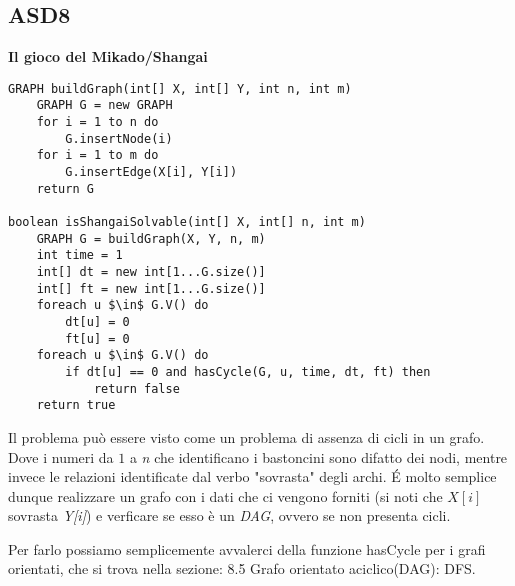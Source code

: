 \documentclass[../cheatSheetAlgoritmi.tex]{subfiles}
\begin{document}
\subsection{ASD8}
\textbf{Il gioco del Mikado/Shangai}
\begin{lstlisting}[caption=Posso vincere Mikado/Shangai in un unico turno?]
GRAPH buildGraph(int[] X, int[] Y, int n, int m)
	GRAPH G = new GRAPH
  	for i = 1 to n do
    	G.insertNode(i)
  	for i = 1 to m do
    	G.insertEdge(X[i], Y[i])
  	return G

boolean isShangaiSolvable(int[] X, int[] n, int m)
	GRAPH G = buildGraph(X, Y, n, m)
  	int time = 1
  	int[] dt = new int[1...G.size()]
  	int[] ft = new int[1...G.size()]
  	foreach u $\in$ G.V() do
    	dt[u] = 0
    	ft[u] = 0
  	foreach u $\in$ G.V() do
    	if dt[u] == 0 and hasCycle(G, u, time, dt, ft) then
      		return false
  	return true
\end{lstlisting}
Il problema può essere visto come un problema di assenza di cicli in un grafo. Dove i numeri da $1$ a \textit{n} che identificano i bastoncini sono difatto dei nodi, mentre invece le relazioni identificate dal verbo "sovrasta" degli archi. É molto semplice dunque realizzare un grafo con i dati che ci vengono forniti (si noti che $X[i]$ sovrasta \textit{Y[i]}) e verficare se esso è un \textit{DAG}, ovvero se non presenta cicli. 

Per farlo possiamo semplicemente avvalerci della funzione hasCycle per i grafi orientati, che si trova nella sezione: 8.5 Grafo orientato aciclico(DAG): DFS.

\bigskip
\end{document}

